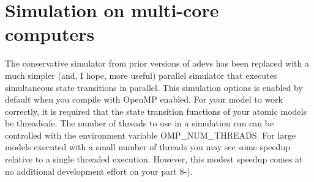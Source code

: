 \chapter{Simulation on multi-core computers}
The conservative simulator from prior versions of adevs has been replaced with a much simpler (and, I hope, more useful) parallel simulator that executes simultaneous state transitions in parallel. This simulation options is enabled by default when you compile with OpenMP enabled. For your model to work correctly, it is required that the state transition functions of your atomic models be threadsafe. The number of threads to use in a simulation run can be controlled with the environment variable OMP\_NUM\_THREADS. For large models executed with a small number of threads you may see some speedup relative to a single threaded execution. However, this modest speedup comes at no additional development effort on your part 8-).
